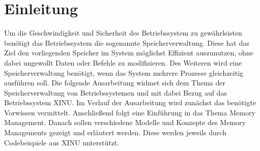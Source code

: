 \section{Einleitung}
\label{sec:Einleitung}
Um die Geschwindigkeit und Sicherheit des Betriebssystem zu gewährleisten benötigt das Betriebssystem die sogenannte Speicherverwaltung. Diese hat das Ziel den vorliegenden Speicher im System möglichst Effizient auszunutzen, ohne dabei ungewollt Daten oder Befehle zu modifizieren. Des Weiteren wird eine Speicherverwaltung benötigt, wenn das System mehrere Prozesse gleichzeitig ausführen soll. Die folgende Ausarbeitung widmet sich dem Thema der Speicherverwaltung von Betriebssystemen und mit dabei Bezug auf das Betriebssystem XINU.
Im Verlauf der Ausarbeitung wird zunächst das benötigte Vorwissen vermittelt. Anschließend folgt eine Einführung in das Thema Memory Management. Danach sollen verschiedene Modelle und Konzepte des Memory Managements gezeigt und erläutert werden. Diese werden jeweils durch Codebeispiele aus XINU unterstützt.
